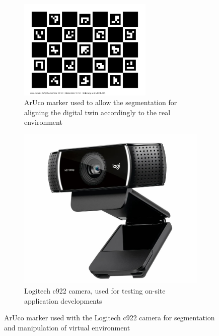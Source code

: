     \begin{figure}[h]
        \centering
        \begin{subfigure}[b]{0.45\textwidth}
        \centering
        \includegraphics[width=0.7\textwidth]{figs/calib_io_charuco_200x150_5x7_25_18_DICT_4X4.png}
        \caption{ArUco marker used to allow the segmentation for aligning the digital twin accordingly to the real environment}
        \label{f:aruco_marker}
        \end{subfigure}
            \hfill %
        \begin{subfigure}[b]{0.45\textwidth}
            \centering
            \includegraphics[width=0.7\linewidth]{figs/camera-c922.jpg}
            \caption{Logitech c922 camera, used for testing on-site application developments}
            \label{fig:camera-c922}
        \end{subfigure}
        \caption{ArUco marker used with the Logitech c922 camera for segmentation and manipulation of virtual environment}
    \label{marker-camera}
    \end{figure}
    
